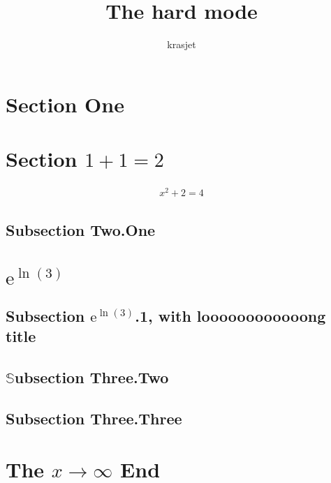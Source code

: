 \documentclass{article}[12pt]
\title{The hard mode}
\author{krasjet}
\date{}
\begin{document}
\begin{multicols}{2}
[
  \maketitle
]

\section{Section One}

\lipsum[2-3]

\section{Section $1 + 1 = 2$}

\lipsum[2-1]
\begin{align*}
  x^2 + 2 = 4
\end{align*}
\lipsum[2-1]

\subsection{Subsection Two.One}
\lipsum[2-5]

\section*{$\mathrm{e}^{\ln(3)}$}

\setcounter{section}{3}
\setcounter{subsection}{0}

\lipsum[1-2]

\subsection{Subsection $\mathrm{e}^{\ln(3)}$.1, with looo\-ooooooooong title}
\lipsum[2-5]

\subsection{$\mathbb{S}$ubsection Three.Two}
\lipsum[1-1]

\subsection{Subsection Three.Three}
\lipsum[2-3]

\section{The $x \to \infty$ End}

\lipsum[2-2]

\end{multicols}
\end{document}
